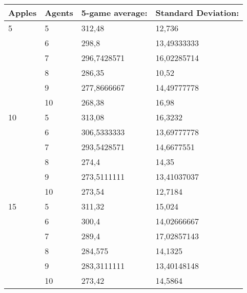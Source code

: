 \begin{table}[]
\begin{tabular}{ll|ll}
\textbf{Apples} & \textbf{Agents} & \textbf{5-game average:} & \textbf{Standard Deviation:} \\ \hline
5               & 5               & 312,48                   & 12,736                       \\
                & 6               & 298,8                    & 13,49333333                  \\
                & 7               & 296,7428571              & 16,02285714                  \\
                & 8               & 286,35                   & 10,52                        \\
                & 9               & 277,8666667              & 14,49777778                  \\
                & 10              & 268,38                   & 16,98                        \\
10              & 5               & 313,08                   & 16,3232                      \\
                & 6               & 306,5333333              & 13,69777778                  \\
                & 7               & 293,5428571              & 14,6677551                   \\
                & 8               & 274,4                    & 14,35                        \\
                & 9               & 273,5111111              & 13,41037037                  \\
                & 10              & 273,54                   & 12,7184                      \\
15              & 5               & 311,32                   & 15,024                       \\
                & 6               & 300,4                    & 14,02666667                  \\
                & 7               & 289,4                    & 17,02857143                  \\
                & 8               & 284,575                  & 14,1325                      \\
                & 9               & 283,3111111              & 13,40148148                  \\
                & 10              & 273,42                   & 14,5864                      \\

\end{tabular}
\end{table}
